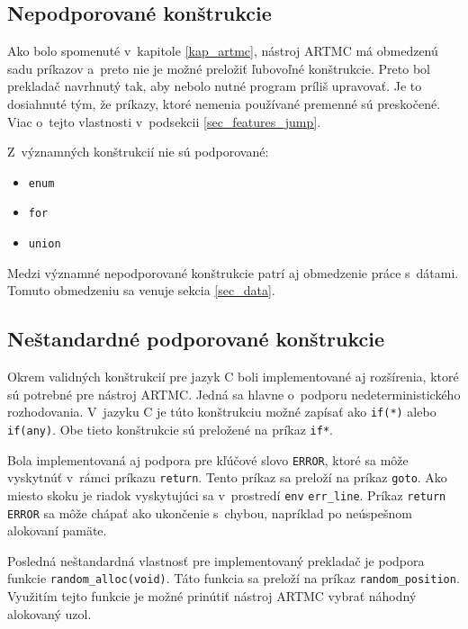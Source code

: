 \subsection{Nepodporované konštrukcie}
Ako bolo spomenuté v~kapitole \ref{kap_artmc}, nástroj ARTMC má obmedzenú sadu príkazov a~preto nie je možné preložiť ľubovoľné konštrukcie. Preto bol prekladač navrhnutý tak, aby nebolo nutné program príliš upravovať. Je to dosiahnuté tým, že príkazy, ktoré nemenia používané premenné sú preskočené. Viac o~tejto vlastnosti v~podsekcii \ref{sec_features_jump}.

Z~významných konštrukcií nie sú podporované:
\begin{itemize}
\item \texttt{enum}
\item \texttt{for}
\item \texttt{union}
\end{itemize}

Medzi významné nepodporované konštrukcie patrí aj obmedzenie práce s~dátami. Tomuto obmedzeniu sa venuje sekcia \ref{sec_data}.

\subsection{Neštandardné podporované konštrukcie}
Okrem validných konštrukcií pre jazyk C boli implementované aj rozšírenia, ktoré sú potrebné pre nástroj ARTMC. Jedná sa hlavne o~podporu nedeterministického rozhodovania. V~jazyku C je túto konštrukciu možné zapísať ako \texttt{if(*)} alebo \texttt{if(any)}. Obe tieto konštrukcie sú preložené na príkaz \texttt{if*}.

Bola implementovaná aj podpora pre kľúčové slovo \texttt{ERROR}, ktoré sa môže vyskytnúť v~rámci príkazu \texttt{return}. Tento príkaz sa preloží na príkaz \texttt{goto}. Ako miesto skoku je riadok vyskytujúci sa v~prostredí \texttt{env} \texttt{err\_line}. Príkaz \texttt{return ERROR} sa môže chápať ako ukončenie s~chybou, napríklad po neúspešnom alokovaní pamäte.

Posledná neštandardná vlastnosť pre implementovaný prekladač je podpora funkcie \texttt{random\_alloc(void)}. Táto funkcia sa preloží na príkaz \texttt{random\_position}. Využitím tejto funkcie je možné prinútiť nástroj ARTMC vybrať náhodný alokovaný uzol.

